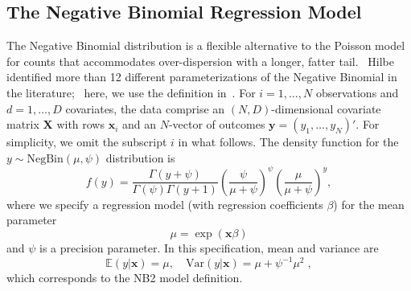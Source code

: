 \documentclass[a4paper,UKenglish]{oasics}
\begin{document}
\subsection{The Negative Binomial Regression Model}
The Negative Binomial distribution is a flexible alternative to the Poisson model for counts that accommodates over-dispersion with a longer, fatter tail.~\cite{hu}
Hilbe identified more than 12 different parameterizations of the Negative Binomial in the literature;~\cite{hilbe} here, we use the definition in~\cite{DebTrivedi}.  
For $i=1,\ldots,N$ observations and $d=1,\ldots,D$ covariates, the data comprise an $(N,D)$-dimensional covariate matrix $\mathbf{X}$ with rows $\mathbf{x}_i$ and an $N$-vector of outcomes $\mathbf{y} = (y_1,\ldots,y_N)'$. For simplicity, we omit the subscript $i$ in what follows.
The density function for the $y \sim \text{NegBin}(\mu,\psi)$ distribution is
$$
f(y) = \frac{\Gamma(y+\psi)}{\Gamma(\psi)\Gamma(y+1)}\left( \frac{\psi}{\mu+\psi} \right)^{\psi} \left( \frac{\mu}{\mu + \psi} \right)^{y},
$$
where we specify a regression model (with regression coefficients $\beta$) for the mean parameter
$$
\mu = \exp(\mathbf{x}\beta)
$$
and $\psi$ is a precision parameter.
In this specification, mean and variance are
$$
\mathbb{E}(y|\mathbf{x}) =\mu, \quad \text{Var}(y|\mathbf{x})= \mu+\psi^{-1} \mu^{2}\;,
$$
which corresponds to the NB2 model definition.~\cite{cameron}
\end{document}
